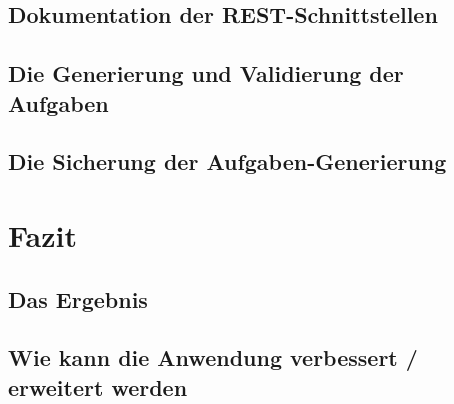 \section{Dokumentation der REST-Schnittstellen}

\section{Die Generierung und Validierung der Aufgaben}

\section{Die Sicherung der Aufgaben-Generierung}



\chapter{Fazit}




\section{Das Ergebnis}


\section{Wie kann die Anwendung verbessert / erweitert werden}


